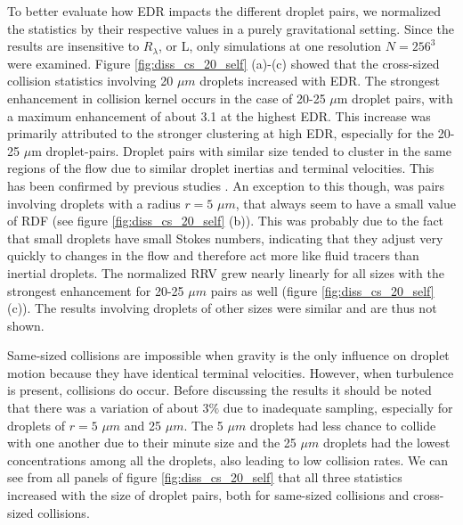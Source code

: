 To better evaluate how EDR impacts the different droplet pairs, we normalized the statistics by their respective values in a purely gravitational setting. Since the results are insensitive to $R_\lambda$, or L, only simulations at one resolution  $N=256^3$ were examined. Figure \ref{fig:diss_cs_20_self} (a)-(c) showed that the cross-sized collision statistics involving 20 $\mu m$ droplets increased with EDR. The strongest enhancement in collision kernel occurs in the case of 20-25 $\mu$m droplet pairs, with a maximum enhancement of about 3.1 at the highest EDR. This increase was primarily attributed to the stronger clustering at high EDR, especially for the 20-25 $\mu$m droplet-pairs. Droplet pairs with similar size tended to cluster in the same regions of the flow due to similar droplet inertias and terminal velocities. This has been confirmed by previous studies \citep[e.g.,][]{Ayala2008a,Franklin2005}. An exception to this though, was pairs involving droplets with a radius $r = 5$ $\mu m$, that always seem to have a small value of RDF (see figure \ref{fig:diss_cs_20_self} (b)). This was probably due to the fact that small droplets have small Stokes numbers, indicating that they adjust very quickly to changes in the flow and therefore act more like fluid tracers than inertial droplets. The normalized RRV grew nearly linearly for all sizes with the strongest enhancement for 20-25 $\mu m$ pairs as well (figure \ref{fig:diss_cs_20_self} (c)). The results involving droplets of other sizes were similar and are thus not shown.

Same-sized collisions are impossible when gravity is the only influence on droplet motion because they have identical terminal velocities. However, when turbulence is present, collisions do occur. Before discussing the results it should be noted that there was a variation of about $3\%$ due to inadequate sampling, especially for droplets of $r=5$ $\mu m$ and 25 $\mu m$. The 5 $\mu m$ droplets had less chance to collide with one another due to their minute size and the 25 $\mu m$ droplets had the lowest concentrations among all the droplets, also leading to low collision rates. We can see from all panels of figure \ref{fig:diss_cs_20_self} that all three statistics increased with the size of droplet pairs, both for same-sized collisions and cross-sized collisions.

